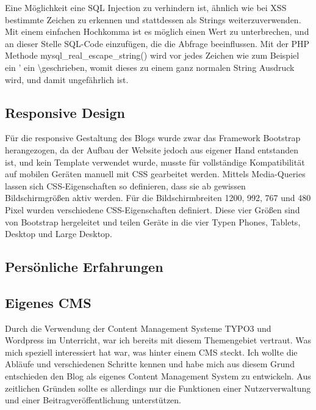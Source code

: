 {      Eine Möglichkeit eine SQL Injection zu verhindern ist, ähnlich wie bei XSS bestimmte Zeichen zu erkennen und stattdessen als Strings weiterzuverwenden.
      Mit einem einfachen Hochkomma ist es möglich einen Wert zu unterbrechen, und an dieser Stelle SQL-Code einzufügen, die die Abfrage beeinflussen.
      Mit der PHP Methode mysql\_real\_escape\_string() wird vor jedes Zeichen wie zum Beispiel ein ' ein \textbackslash geschrieben, womit dieses zu einem ganz normalen
      String Ausdruck wird, und damit ungefährlich ist.

    \subsection*{Responsive Design}
    Für die responsive Gestaltung des Blogs wurde zwar das Framework Bootstrap herangezogen, da der Aufbau der Website jedoch aus eigener Hand
    entstanden ist, und kein Template verwendet wurde, musste für vollständige Kompatibilität auf mobilen Geräten manuell mit CSS gearbeitet werden.
    Mittels Media-Queries lassen sich CSS-Eigenschaften so definieren, dass sie ab gewissen Bildschirmgrößen aktiv werden. Für die Bildschirmbreiten 1200, 992, 767 und 480
    Pixel wurden verschiedene CSS-Eigenschaften definiert. Diese vier Größen sind von Bootstrap hergeleitet und teilen Geräte in die vier Typen Phones, Tablets,
    Desktop und Large Desktop.

  \subsection{Persönliche Erfahrungen}
    \subsection*{Eigenes CMS}
    Durch die Verwendung der Content Management Systeme TYPO3 und Wordpress im Unterricht, war ich bereits mit diesem Themengebiet vertraut. Was mich speziell interessiert hat war,
    was hinter einem CMS steckt. Ich wollte die Abläufe und verschiedenen Schritte kennen und habe mich aus diesem Grund entschieden den Blog als eigenes Content Management System
    zu entwickeln. Aus zeitlichen Gründen sollte es allerdings nur die Funktionen einer Nutzerverwaltung und einer Beitragveröffentlichung unterstützen.

}
